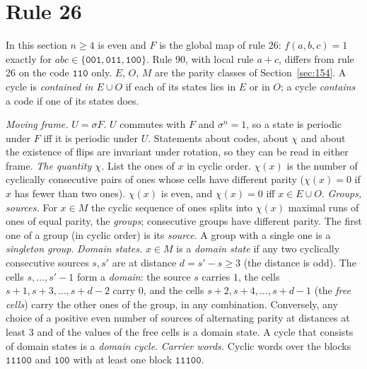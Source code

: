 \documentclass[10pt,a4paper]{article}
\newcommand{\code}[1]{\mathtt{#1}}            %
\begin{document}
\section{Rule 26}\label{sec:26}

In this section $n\ge 4$ is even and $F$ is the global map of rule 26: $f(a,b,c)=1$ exactly for
$abc\in\{\code{001},\code{011},\code{100}\}$. Rule 90, with local rule $a+c$, differs from rule 26 on the code
$\code{110}$ only. $E$, $O$, $M$ are the parity classes of Section~\ref{sec:154}. A cycle is \emph{contained in
$E\cup O$} if each of its states lies in $E$ or in $O$; a cycle \emph{contains} a code if one of its states does.

\begin{definition}\label{26:def}
\emph{Moving frame.} $U=\sigma F$. $U$ commutes with $F$ and $\sigma^n=1$, so a state is periodic under $F$ iff it is
periodic under $U$. Statements about codes, about $\chi$ and about the existence of flips are invariant under rotation,
so they can be read in either frame.
\emph{The quantity $\chi$.} List the ones of $x$ in cyclic order. $\chi(x)$ is the number of cyclically consecutive
pairs of ones whose cells have different parity ($\chi(x)=0$ if $x$ has fewer than two ones). $\chi(x)$ is even, and
$\chi(x)=0$ iff $x\in E\cup O$.
\emph{Groups, sources.} For $x\in M$ the cyclic sequence of ones splits into $\chi(x)$ maximal runs of ones of equal
parity, the \emph{groups}; consecutive groups have different parity. The first one of a group (in cyclic order) is its
\emph{source}. A group with a single one is a \emph{singleton group}.
\emph{Domain states.} $x\in M$ is a \emph{domain state} if any two cyclically consecutive sources $s,s'$ are at
distance $d=s'-s\ge 3$ (the distance is odd). The cells $s,\dots,s'-1$ form a \emph{domain}: the source $s$ carries
$1$, the cells $s+1,s+3,\dots,s+d-2$ carry $0$, and the cells $s+2,s+4,\dots,s+d-1$ (the \emph{free cells}) carry the
other ones of the group, in any combination. Conversely, any choice of a positive even number of sources of alternating parity
at distances at least $3$ and of the values of the free cells is a domain state. A cycle that consists of domain states
is a \emph{domain cycle}.
\emph{Carrier words.} Cyclic words over the blocks $\code{11100}$ and $\code{100}$ with at least one block
$\code{11100}$.
\end{definition}
\end{document}
